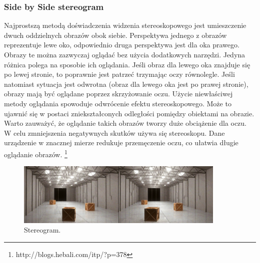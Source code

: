 \subsubsection{Side by Side stereogram}
Najprostszą metodą doświadczenia widzenia stereoskopowego jest umieszczenie dwuch oddzielnych obrazów obok siebie. Perspektywa jednego z obrazów reprezentuje lewe oko, odpowiednio druga perspektywa jest dla oka prawego. Obrazy te można zazwyczaj oglądać bez użycia dodatkowych narzędzi. Jedyna różnica polega na sposobie ich oglądania. Jeśli obraz dla lewego oka znajduje się po lewej stronie, to poprawnie jest patrzeć trzymając oczy równolegle. Jeśli natomiast sytuacja jest odwrotna (obraz dla lewego oka jest po prawej stronie), obrazy mają być oglądane poprzez skrzyżowanie oczu. Użycie niewłaściwej metody oglądania spowoduje odwrócenie efektu stereoskopowego. Może to ujawnić się w postaci zniekształconych odległości pomiędzy obiektami na obrazie.\\
Warto zauważyć, że oglądanie takich obrazów tworzy duże obciążenie dla oczu. W celu zmniejszenia negatywnych skutków używa się stereoskopu. Dane urządzenie w znacznej mierze redukuje przemęczenie oczu, co ułatwia długie oglądanie obrazów.
\footnote{http://blogs.hebali.com/itp/?p=378}
\begin{figure}[H]
		\centering
 		\includegraphics[width=10cm]{sbs.jpg}
    	\caption{Stereogram.}
 		\label{rys1}
\end{figure}


